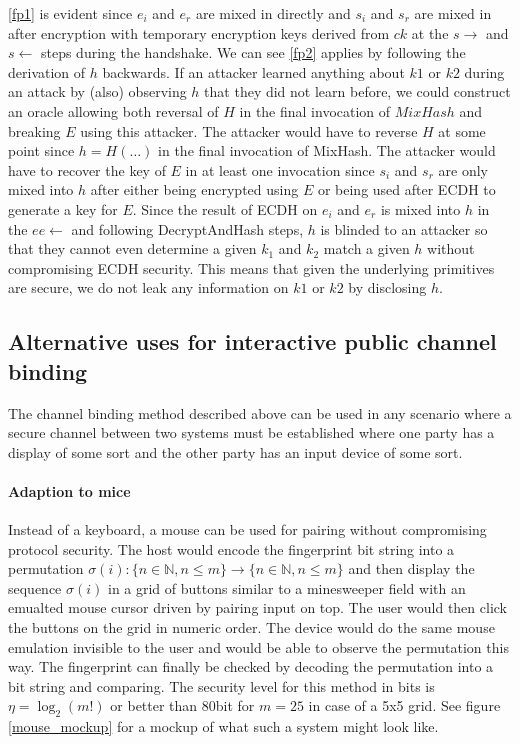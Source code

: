\documentclass[12pt,a4paper,notitlepage]{article}
\begin{document}
\ref{fp1} is evident since $e_i$ and $e_r$ are mixed in directly and $s_i$ and $s_r$ are mixed in after encryption with
temporary encryption keys derived from $ck$ at the $s\rightarrow$ and $s\leftarrow$ steps during the handshake.
We can see \ref{fp2} applies by following the derivation of $h$ backwards. If an attacker learned anything about $k1$ or
$k2$ during an attack by (also) observing $h$ that they did not learn before, we could construct an oracle allowing both
reversal of $H$ in the final invocation of $MixHash$ and breaking $E$ using this attacker. The attacker would have to
reverse $H$ at some point since $h = H(\hdots)$ in the final invocation of MixHash. The attacker would have to recover
the key of $E$ in at least one invocation since $s_i$ and $s_r$ are only mixed into $h$ after either being encrypted
using $E$ or being used after ECDH to generate a key for $E$. Since the result of ECDH on $e_i$ and $e_r$ is mixed into
$h$ in the $ee\leftarrow$ and following DecryptAndHash steps, $h$ is blinded to an attacker so that they cannot even
determine a given $k_1$ and $k_2$ match a given $h$ without compromising ECDH security.
This means that given the underlying primitives are secure, we do not leak any information on $k1$ or $k2$ by disclosing
$h$.

\subsection{Alternative uses for interactive public channel binding}

The channel binding method described above can be used in any scenario where a secure channel between two systems must
be established where one party has a display of some sort and the other party has an input device of some sort. 

\paragraph{Adaption to mice} Instead of a keyboard, a mouse can be used for pairing without compromising protocol
security. The host would encode the fingerprint bit string into a permutation
$\sigma(i) : \{n\in\mathbb N, n\le m\} \rightarrow \{n\in\mathbb N, n\le m\}$ 
and then display the sequence $\sigma(i)$ in a grid of buttons similar to a minesweeper field with an emualted mouse
cursor driven by pairing input on top. The user would then click the buttons on the grid in numeric order. The device
would do the same mouse emulation invisible to the user and would be able to observe the permutation this way. The
fingerprint can finally be checked by decoding the permutation into a bit string and comparing. The security level for
this method in bits is $\eta = \log_2(m!)$ or better than 80bit for $m=25$ in case of a 5x5 grid.  See figure
\ref{mouse_mockup} for a mockup of what such a system might look like. 
\end{document}
